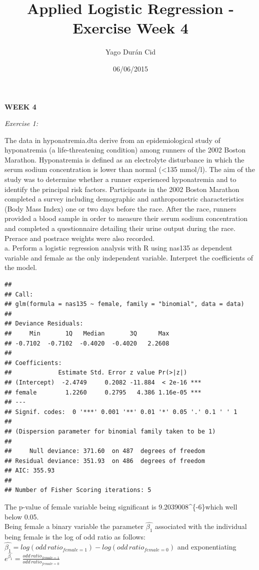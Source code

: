 \documentclass[]{article}
\title{Applied Logistic Regression - Exercise Week 4}
\author{Yago Durán Cid}
\date{06/06/2015}
\begin{document}
\maketitle


\textbf{WEEK 4}

\emph{Exercise 1:}

The data in hyponatremia.dta derive from an epidemiological study of
hyponatremia (a life-threatening condition) among runners of the 2002
Boston Marathon. Hyponatremia is defined as an electrolyte disturbance
in which the serum sodium concentration is lower than normal
(\textless{}135 mmol/l). The aim of the study was to determine whether a
runner experienced hyponatremia and to identify the principal risk
factors. Participants in the 2002 Boston Marathon completed a survey
including demographic and anthropometric characteristics (Body Mass
Index) one or two days before the race. After the race, runners provided
a blood sample in order to measure their serum sodium concentration and
completed a questionnaire detailing their urine output during the race.
Prerace and postrace weights were also recorded.\\a. Perform a logistic
regression analysis with R using nas135 as dependent variable and female
as the only independent variable. Interpret the coefficients of the
model.

\begin{verbatim}
## 
## Call:
## glm(formula = nas135 ~ female, family = "binomial", data = data)
## 
## Deviance Residuals: 
##     Min       1Q   Median       3Q      Max  
## -0.7102  -0.7102  -0.4020  -0.4020   2.2608  
## 
## Coefficients:
##             Estimate Std. Error z value Pr(>|z|)    
## (Intercept)  -2.4749     0.2082 -11.884  < 2e-16 ***
## female        1.2260     0.2795   4.386 1.16e-05 ***
## ---
## Signif. codes:  0 '***' 0.001 '**' 0.01 '*' 0.05 '.' 0.1 ' ' 1
## 
## (Dispersion parameter for binomial family taken to be 1)
## 
##     Null deviance: 371.60  on 487  degrees of freedom
## Residual deviance: 351.93  on 486  degrees of freedom
## AIC: 355.93
## 
## Number of Fisher Scoring iterations: 5
\end{verbatim}

The p-value of female variable being significant is
9.2039008\^{}\{-6\}which well below 0.05.\\Being female a
binary variable the parameter $\hat{\beta_1}$ associated with the
individual being female is the log of odd ratio as
follows:\\$\hat{\beta_1}=log(odd\,ratio_{female=1})-log(odd\,ratio_{female=0})$
and exponentiating
$e^{\hat{\beta_1}}=\frac{odd\,ratio_{female=1}}{odd\,ratio_{female=0}}$
\end{document}
